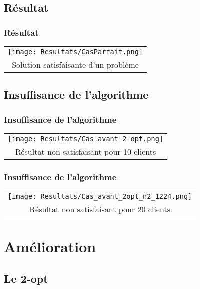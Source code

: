 \documentclass[10pt]{beamer}
\begin{document}
	\subsection{Résultat}

	\begin{frame}
		\frametitle{Résultat}
		\begin{center}
			\begin{tabular}{c}
				\texttt{[image: Resultats/CasParfait.png]}
				\\
				Solution satisfaisante d'un problème
			\end{tabular}
		\end{center}
	\end{frame}

	\subsection{Insuffisance de l'algorithme}
	   
	\begin{frame}
		\frametitle{Insuffisance de l'algorithme}
		\begin{center}
			\begin{tabular}{c}
				\texttt{[image: Resultats/Cas\_avant\_2-opt.png]}
				\\
				Résultat non satisfaisant pour 10 clients
			\end{tabular}
		\end{center}
	\end{frame}

	\begin{frame}
		\frametitle{Insuffisance de l'algorithme}
		\begin{center}
			\begin{tabular}{c}
				\texttt{[image: Resultats/Cas\_avant\_2opt\_n2\_1224.png]}
				\\
				Résultat non satisfaisant pour 20 clients	
			\end{tabular}
		\end{center}
	\end{frame}

	\section{Amélioration}

	\subsection{Le 2-opt}
\end{document}
